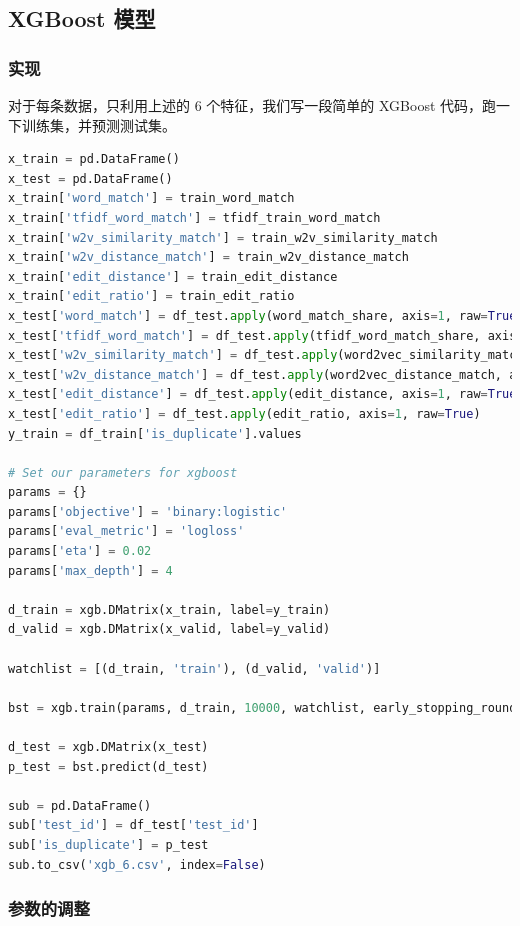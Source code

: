 \documentclass{article}
\begin{document}
\subsection{XGBoost 模型}

\subsubsection{实现}

对于每条数据，只利用上述的 $6$ 个特征，我们写一段简单的 XGBoost 代码，跑一下训练集，并预测测试集。

\begin{lstlisting}[language=python]
x_train = pd.DataFrame()
x_test = pd.DataFrame()
x_train['word_match'] = train_word_match
x_train['tfidf_word_match'] = tfidf_train_word_match
x_train['w2v_similarity_match'] = train_w2v_similarity_match
x_train['w2v_distance_match'] = train_w2v_distance_match
x_train['edit_distance'] = train_edit_distance
x_train['edit_ratio'] = train_edit_ratio
x_test['word_match'] = df_test.apply(word_match_share, axis=1, raw=True)
x_test['tfidf_word_match'] = df_test.apply(tfidf_word_match_share, axis=1, raw=True)
x_test['w2v_similarity_match'] = df_test.apply(word2vec_similarity_match, axis=1, raw=True)
x_test['w2v_distance_match'] = df_test.apply(word2vec_distance_match, axis=1, raw=True)
x_test['edit_distance'] = df_test.apply(edit_distance, axis=1, raw=True)
x_test['edit_ratio'] = df_test.apply(edit_ratio, axis=1, raw=True)
y_train = df_train['is_duplicate'].values

# Set our parameters for xgboost
params = {}
params['objective'] = 'binary:logistic'
params['eval_metric'] = 'logloss'
params['eta'] = 0.02
params['max_depth'] = 4

d_train = xgb.DMatrix(x_train, label=y_train)
d_valid = xgb.DMatrix(x_valid, label=y_valid)

watchlist = [(d_train, 'train'), (d_valid, 'valid')]

bst = xgb.train(params, d_train, 10000, watchlist, early_stopping_rounds=50, verbose_eval=10)

d_test = xgb.DMatrix(x_test)
p_test = bst.predict(d_test)

sub = pd.DataFrame()
sub['test_id'] = df_test['test_id']
sub['is_duplicate'] = p_test
sub.to_csv('xgb_6.csv', index=False)
\end{lstlisting}

\subsubsection{参数的调整}
\end{document}

